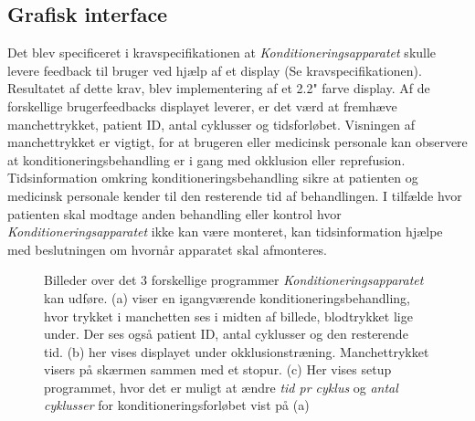 \subsection{Grafisk interface}
Det blev specificeret i kravspecifikationen at \textit{Konditioneringsapparatet} skulle levere feedback til bruger ved hjælp af et display (Se kravspecifikationen). Resultatet af dette krav, blev implementering af et 2.2" farve display. Af de forskellige brugerfeedbacks displayet leverer, er det værd at fremhæve manchettrykket, patient ID, antal cyklusser og tidsforløbet. Visningen af manchettrykket er vigtigt, for at brugeren eller medicinsk personale kan observere at konditioneringsbehandling er i gang med okklusion eller reprefusion. Tidsinformation omkring konditioneringsbehandling sikre at patienten og medicinsk personale kender til den resterende tid af behandlingen. I tilfælde hvor patienten skal modtage anden behandling eller kontrol hvor \textit{Konditioneringsapparatet} ikke kan være monteret, kan tidsinformation hjælpe med beslutningen om hvornår apparatet skal afmonteres. 

\begin{figure}[H]
\centering
{}
\caption{Billeder over det 3 forskellige programmer \textit{Konditioneringsapparatet} kan udføre. (a) viser en igangværende konditioneringsbehandling, hvor trykket i manchetten ses i midten af billede, blodtrykket lige under. Der ses også patient ID, antal cyklusser og den resterende tid. (b) her vises displayet under okklusionstræning. Manchettrykket visers på skærmen sammen med et stopur. (c) Her vises setup programmet, hvor det er muligt at ændre \textit{tid pr cyklus} og \textit{antal cyklusser} for konditioneringsforløbet vist på (a)}\label{fig:interface}
\end{figure}


